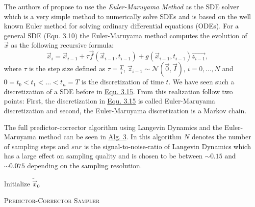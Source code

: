The authors of \cite{score_3} propose to use the \textit{Euler-Maruyama Method} as the SDE solver which is a very simple method to numerically solve SDEs and is based on the well known Euler method for solving ordinary differential equations (ODEs). For a general SDE (\hyperref[equ:3.10]{Equ. 3.10}) the Euler-Maruyama method computes the evolution of $\vec{x}$ as the following recursive formula:
%
\begin{equation} \label{equ:3.20}
    \vec{x}_i=\vec{x}_{i-1}+\tau\vec{f}(\vec{x}_{i-1}, t_{i-1})+g(\vec{x}_{i-1}, t_{i-1})\vec{z_{i-1}},
\end{equation}
%
where $\tau$ is the step size defined as $\tau=\frac{T}{i}$, $\vec{z}_{i-1}\sim\mathcal{N}(\vec{0},\vec{I})$, $i=0,\dots,N$ and $0=t_0<t_1<\dots<t_n=T$ is the discretization of time $t$. We have seen such a discretization of a SDE before in \hyperref[equ:3.15]{Equ. 3.15}. From this realization follow two points: First, the discretization in \hyperref[equ:3.15]{Equ. 3.15} is called Euler-Maruyama discretization and second, the Euler-Maruyama discretization is a Markov chain.

The full predictor-corrector algorithm using Langevin Dynamics and the Euler-Maruyama method can be seen in \hyperref[alg:3]{Alg. 3}. In this algorithm $N$ denotes the number of sampling steps and $snr$ is the signal-to-noise-ratio of Langevin Dynamics which has a large effect on sampling quality and is chosen to be between $\sim0.15$ and $\sim0.075$ depending on the sampling resolution. 
%
\begin{algorithm} \label{alg:3}
    \DontPrintSemicolon
    Initialize $\tilde{\vec{x}}_0$\;

    
    \caption{\textsc{Predictor-Corrector Sampler}}
\end{algorithm}
%
